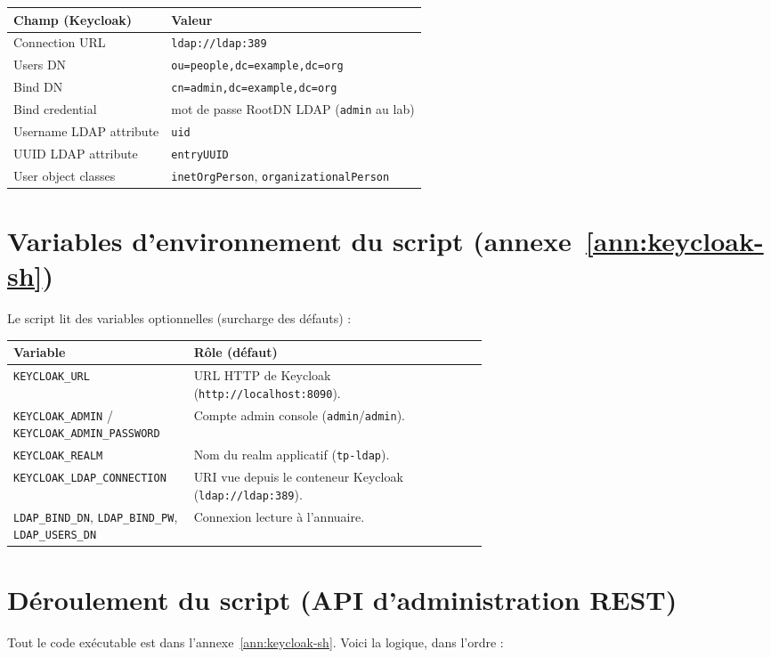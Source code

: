 \documentclass[11pt,a4paper]{report}
\begin{document}
\begin{tabular}{@{}ll@{}}
\toprule
\textbf{Champ (Keycloak)} & \textbf{Valeur} \\
\midrule
Connection URL & \texttt{ldap://ldap:389} \\
Users DN & \texttt{ou=people,dc=example,dc=org} \\
Bind DN & \texttt{cn=admin,dc=example,dc=org} \\
Bind credential & mot de passe RootDN LDAP (\texttt{admin} au lab) \\
Username LDAP attribute & \texttt{uid} \\
UUID LDAP attribute & \texttt{entryUUID} \\
User object classes & \texttt{inetOrgPerson}, \texttt{organizationalPerson} \\
\bottomrule
\end{tabular}

\section{Variables d'environnement du script (annexe~\ref{ann:keycloak-sh})}

Le script lit des variables optionnelles (surcharge des défauts) :

\begin{tabular}{@{}lp{0.62\linewidth}@{}}
\toprule
\textbf{Variable} & \textbf{Rôle (défaut)} \\
\midrule
\texttt{KEYCLOAK\_URL} & URL HTTP de Keycloak (\texttt{http://localhost:8090}). \\
\texttt{KEYCLOAK\_ADMIN} / \texttt{KEYCLOAK\_ADMIN\_PASSWORD} & Compte admin console (\texttt{admin}/\texttt{admin}). \\
\texttt{KEYCLOAK\_REALM} & Nom du realm applicatif (\texttt{tp-ldap}). \\
\texttt{KEYCLOAK\_LDAP\_CONNECTION} & URI vue depuis le conteneur Keycloak (\texttt{ldap://ldap:389}). \\
\texttt{LDAP\_BIND\_DN}, \texttt{LDAP\_BIND\_PW}, \texttt{LDAP\_USERS\_DN} & Connexion lecture à l'annuaire. \\
\bottomrule
\end{tabular}

\section{Déroulement du script (API d'administration REST)}

Tout le code exécutable est dans l'annexe~\ref{ann:keycloak-sh}. Voici la logique, dans l'ordre :
\end{document}
